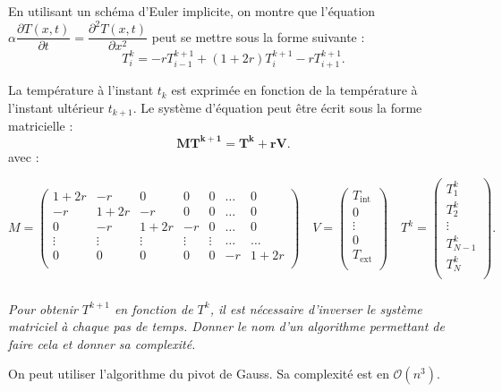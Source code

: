 \documentclass[10pt,fleqn]{article} %
\begin{document}
En utilisant un schéma d'Euler implicite, on montre que l'équation 
$\alpha \dfrac{\partial T(x,t)}{\partial t} = \dfrac{\partial^2 T(x,t)}{\partial x^2}$
 peut se mettre sous la forme suivante : 
$$
T_i^k = -rT_{i-1}^{k+1} + \left( 1+2r\right) T_{i}^{k+1}-rT_{i+1}^{k+1}.
$$

La température à l'instant $t_k$ est exprimée en fonction de la température à l'instant 
ultérieur $t_{k+1}$.
Le système d'équation peut être écrit sous la forme matricielle : 
\begin{equation} \label{eq_implicite}
\mathbf{M T^{k+1} = T^k + rV}.
\end{equation}
avec : 

$$
M = 
\begin{pmatrix}
1+2r & -r     & 0 & 0 & 0 &  \ldots & 0 \\
-r     & 1+2r & -r & 0 & 0  & \ldots &  0 \\
0    & -r & 1+2r & -r & 0   & \ldots&  0 \\
\vdots & \vdots & \vdots & \vdots & \vdots & \ldots & \ldots \\
0& 0& 0& 0& 0& -r & 1+2r\\
\end{pmatrix}
\quad 
V = \begin{pmatrix}
T_{\text{int}} \\
0 \\
\vdots \\
0 \\
T_{\text{ext}} \\
\end{pmatrix}
\quad 
T^k = \begin{pmatrix}
T_1^k \\
T_2^k  \\
\vdots \\
T_{N-1}^k  \\
T_N^k \\
\end{pmatrix}.
$$

\fi


\subparagraph{}
\textit{Pour obtenir $T^{k+1}$ en fonction de $T^{k}$, il est nécessaire d'inverser le 
système matriciel à chaque pas de temps.
Donner le nom d'un algorithme permettant de faire cela et donner sa complexité.}

\ifprof
\begin{corrige}
On peut utiliser l'algorithme du pivot de Gauss. Sa complexité est en $\mathcal{O}(n^3)$.
\end{corrige}
\else
\fi
\end{document}
